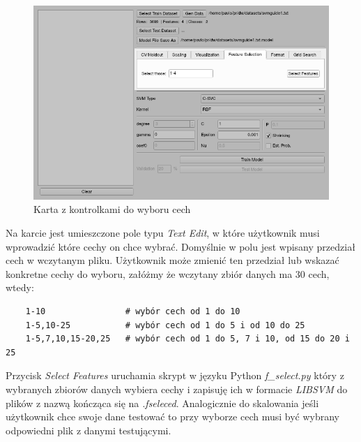\documentclass[paper=a4, fontsize=11pt]{scrartcl} %
\numberwithin{equation}{section} %
\numberwithin{figure}{section} %
\begin{document}
    \begin{figure}[H]
        \begin{center}
            \includegraphics[scale=0.7]{./img/svm_app_fs.png}
            \caption{Karta z kontrolkami do wyboru cech}
            \label{fig:feature_selection}
        \end{center}
    \end{figure}

    \par Na karcie jest umieszczone pole typu \textit{Text Edit}, w które użytkownik musi
    wprowadzić które cechy on chce wybrać. Domyślnie w polu jest wpisany przedział cech w
    wczytanym pliku. Użytkownik może zmienić ten przedział lub wskazać konkretne cechy do
    wyboru, załóżmy że wczytany zbiór danych ma 30 cech, wtedy:

    \begin{verbatim}
    1-10                # wybór cech od 1 do 10
    1-5,10-25           # wybór cech od 1 do 5 i od 10 do 25
    1-5,7,10,15-20,25   # wybór cech od 1 do 5, 7 i 10, od 15 do 20 i 25
    \end{verbatim}

    \par Przycisk \textit{Select Features} uruchamia skrypt w języku Python
    \textit{f\_select.py} który z wybranych zbiorów danych wybiera cechy i zapisuję ich w
    formacie \textit{LIBSVM} do plików z nazwą kończąca się na \textit{.fseleced}. Analogicznie
    do skalowania jeśli użytkownik chce swoje dane testować to przy wyborze cech musi być
    wybrany odpowiedni plik z danymi testującymi.
\end{document}
